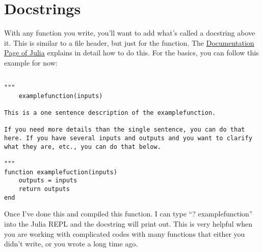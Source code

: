 \documentclass{article}%
\begin{document}
\section{Docstrings}

With any function you write, you'll want to add what's called a docstring above it. This is similar to a file header, but just for the function.  The \href{https://docs.julialang.org/en/v1/manual/documentation/index.html#Accessing-Documentation-1}{Documentation Page of Julia} explains in detail how to do this. For the basics, you can follow this example for now:

\begin{lstlisting}[frame=single]

"""
	examplefunction(inputs)

This is a one sentence description of the examplefunction.

If you need more details than the single sentence, you can do that here. If you have several inputs and outputs and you want to clarify what they are, etc., you can do that below.

"""
function examplefuction(inputs)
	outputs = inputs
	return outputs
end
\end{lstlisting}

Once I've done this and compiled this function. I can type ``? examplefunction'' into the Julia REPL and the docstring will print out. This is very helpful when you are working with complicated codes with many functions that either you didn't write, or you wrote a long time ago.
\end{document}
